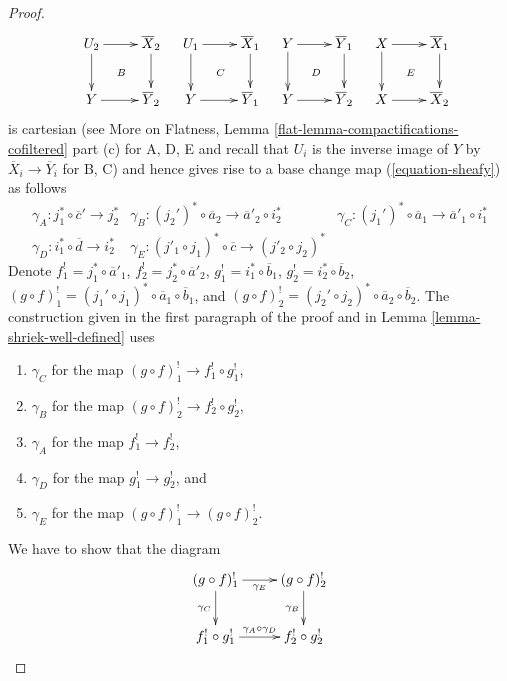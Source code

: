 \begin{proof}
$${}
\quad
\xymatrix{
U_2 \ar[r] \ar[d] \ar@{}[dr]|B & \overline{X}_2 \ar[d] \\
Y \ar[r] & \overline{Y}_2
}
\quad
\xymatrix{
U_1 \ar[r] \ar[d] \ar@{}[dr]|C & \overline{X}_1 \ar[d] \\
Y \ar[r] & \overline{Y}_1
}
\quad
\xymatrix{
Y \ar[r] \ar[d] \ar@{}[dr]|D & \overline{Y}_1 \ar[d] \\
Y \ar[r] & \overline{Y}_2
}
\quad
\xymatrix{
X \ar[r] \ar[d] \ar@{}[dr]|E & \overline{X}_1 \ar[d] \\
X \ar[r] & \overline{X}_2
}
$$
is cartesian (see
More on Flatness, Lemma \ref{flat-lemma-compactifications-cofiltered} part (c)
for A, D, E and recall that $U_i$ is the inverse image of $Y$
by $\overline{X}_i \to \overline{Y}_i$ for B, C) and hence
gives rise to a base change map (\ref{equation-sheafy}) as follows
$$
\begin{matrix}
\gamma_A : j_1^* \circ \overline{c}' \to j_2^* &
\gamma_B : (j_2')^* \circ \overline{a}_2 \to \overline{a}'_2 \circ i_2^* &
\gamma_C : (j_1')^* \circ \overline{a}_1 \to \overline{a}'_1 \circ i_1^* \\
\gamma_D : i_1^* \circ \overline{d} \to i_2^* &
\gamma_E : (j'_1 \circ j_1)^* \circ \overline{c} \to (j'_2 \circ j_2)^*
\end{matrix}
$$
Denote $f_1^! = j_1^* \circ \overline{a}'_1$,
$f_2^! = j_2^* \circ \overline{a}'_2$,
$g_1^! = i_1^* \circ \overline{b}_1$,
$g_2^! = i_2^* \circ \overline{b}_2$,
$(g \circ f)_1^! =
(j_1' \circ j_1)^* \circ \overline{a}_1 \circ \overline{b}_1$, and
$(g \circ f)^!_2 =
(j_2' \circ j_2)^* \circ \overline{a}_2 \circ \overline{b}_2$.
The construction given in the first paragraph of the proof
and in Lemma \ref{lemma-shriek-well-defined} uses
\begin{enumerate}
\item $\gamma_C$ for the map $(g \circ f)^!_1 \to f_1^! \circ g_1^!$,
\item $\gamma_B$ for the map $(g \circ f)^!_2 \to f_2^! \circ g_2^!$,
\item $\gamma_A$ for the map $f_1^! \to f_2^!$,
\item $\gamma_D$ for the map $g_1^! \to g_2^!$, and
\item $\gamma_E$ for the map $(g \circ f)^!_1 \to (g \circ f)^!_2$.
\end{enumerate}
We have to show that the diagram
$$
\xymatrix{
(g \circ f)^!_1 \ar[r]_{\gamma_E} \ar[d]_{\gamma_C} &
(g \circ f)^!_2 \ar[d]_{\gamma_B} \\
f_1^! \circ g_1^! \ar[r]^{\gamma_A \circ \gamma_D} & f_2^! \circ g_2^!
}$$
\end{proof}
